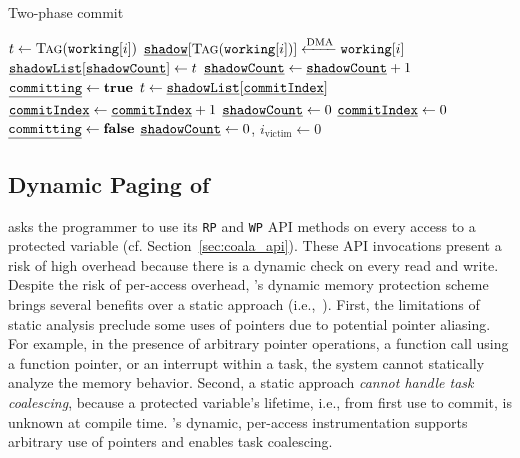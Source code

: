 \begin{algorithm}[t]
	\caption{Two-phase commit}
	\label{algo:commit}
	\scriptsize
	\begin{algorithmic}[1]
         
                \State $t \gets \Call{Tag}{\texttt{working}[i]}$
                \State $\texttt{\underline{shadow}}[\Call{Tag}{\texttt{working}[i]}] \xleftarrow{\text{DMA}} \texttt{working}[i]$
                \State $\texttt{\underline{shadowList}}[\texttt{\underline{shadowCount}}] \gets t$
                \State $\texttt{\underline{shadowCount}} \gets \texttt{\underline{shadowCount}} + 1$
            \EndFor
            \State {}
        \EndProcedure
         
            \State $\texttt{\underline{committing}} \gets \textbf{true}$
                \State $t \gets \texttt{\underline{shadowList}}[\texttt{\underline{commitIndex}}]$
                \State {}
                \State $\texttt{\underline{commitIndex}} \gets \texttt{\underline{commitIndex}} + 1$
            \EndWhile
            \State $\texttt{\underline{shadowCount}} \gets 0$
            \State $\texttt{\underline{commitIndex}} \gets 0$
            \State $\texttt{\underline{committing}} \gets \textbf{false}$
        \EndProcedure
         
             
            \EndIf
            \State $\texttt{\underline{shadowCount}} \gets 0$, $i_\text{victim} \gets 0$
        \EndProcedure
	\end{algorithmic}
\end{algorithm}

\subsection{Dynamic Paging of \sys}

\sys asks the programmer to use its {\tt RP} and {\tt WP} API methods on every access to a protected variable (cf. Section~\ref{sec:coala_api}). These API invocations present a risk of high overhead because there is a dynamic check on every read and write. Despite the risk of per-access overhead, \sys's dynamic memory protection scheme brings several benefits over a static approach (i.e.,~\cite{alpaca}). First, the limitations of static analysis preclude some uses of pointers due to potential pointer aliasing. For example, in the presence of arbitrary pointer operations, a function call using a function pointer, or an interrupt within a task, the system cannot statically analyze the memory behavior. Second, a static approach \textit{cannot handle task coalescing}, because a protected variable's lifetime, i.e., from first use to commit, is unknown at compile time. \sys's dynamic, per-access instrumentation supports arbitrary use of pointers and enables task coalescing.
